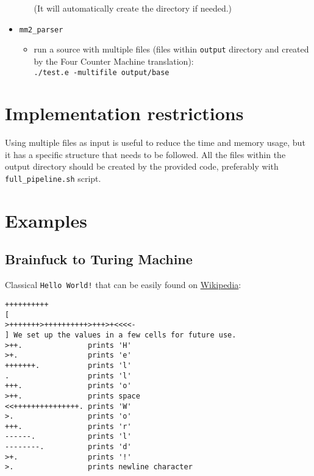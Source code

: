 \documentclass[english,shortabstract,mgr]{iithesis}
\begin{document}
\begin{itemize}
\begin{itemize}
        (It will automatically create the directory if needed.)
    \end{itemize}
  \item \texttt{mm2\_parser}
    \begin{itemize}
      \item run a source with multiple files (files within \texttt{output}
        directory and created by the Four Counter Machine translation): \\ \texttt{./test.e -multifile output/base}
    \end{itemize}
\end{itemize}


\section{Implementation restrictions}

Using multiple files as input is useful to reduce the time and memory
usage, but it has a specific structure that needs to be followed. All the files
within the output directory should be created by the provided code, preferably
with \texttt{full\_pipeline.sh} script.

\section{Examples}

\subsection{Brainfuck to Turing Machine}

Classical \texttt{Hello World!} that can be easily found on \href{https://pl.wikipedia.org/wiki/Brainfuck#Przyk%C5%82ady}{Wikipedia}:

\begin{verbatim}
++++++++++
[
>+++++++>++++++++++>+++>+<<<<-
] We set up the values in a few cells for future use.
>++.               prints 'H'
>+.                prints 'e'
+++++++.           prints 'l'
.                  prints 'l'
+++.               prints 'o'
>++.               prints space
<<+++++++++++++++. prints 'W'
>.                 prints 'o'
+++.               prints 'r'
------.            prints 'l'
--------.          prints 'd'
>+.                prints '!'
>.                 prints newline character
\end{verbatim}
\end{document}

